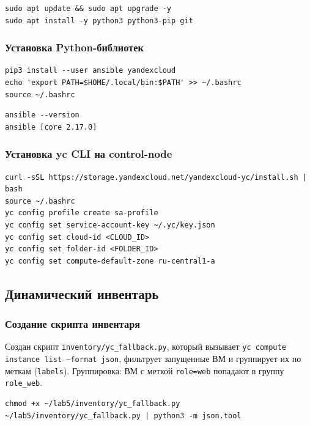 \documentclass[12pt,a4paper]{article}
\begin{document}
\begin{lstlisting}
sudo apt update && sudo apt upgrade -y
sudo apt install -y python3 python3-pip git
\end{lstlisting}

\subsubsection{Установка Python-библиотек}

\begin{lstlisting}
pip3 install --user ansible yandexcloud
echo 'export PATH=$HOME/.local/bin:$PATH' >> ~/.bashrc
source ~/.bashrc
\end{lstlisting}

\begin{lstlisting}
ansible --version
ansible [core 2.17.0]
\end{lstlisting}

\subsubsection{Установка yc CLI на control-node}

\begin{lstlisting}
curl -sSL https://storage.yandexcloud.net/yandexcloud-yc/install.sh | bash
source ~/.bashrc
yc config profile create sa-profile
yc config set service-account-key ~/.yc/key.json
yc config set cloud-id <CLOUD_ID>
yc config set folder-id <FOLDER_ID>
yc config set compute-default-zone ru-central1-a
\end{lstlisting}

\subsection{Динамический инвентарь}

\subsubsection{Создание скрипта инвентаря}

Создан скрипт \texttt{inventory/yc\_fallback.py}, который вызывает \texttt{yc compute instance list --format json}, фильтрует запущенные ВМ и группирует их по меткам (\texttt{labels}). Группировка: ВМ с меткой \texttt{role=web} попадают в группу \texttt{role\_web}.

\begin{lstlisting}
chmod +x ~/lab5/inventory/yc_fallback.py
~/lab5/inventory/yc_fallback.py | python3 -m json.tool
\end{lstlisting}
\end{document}

